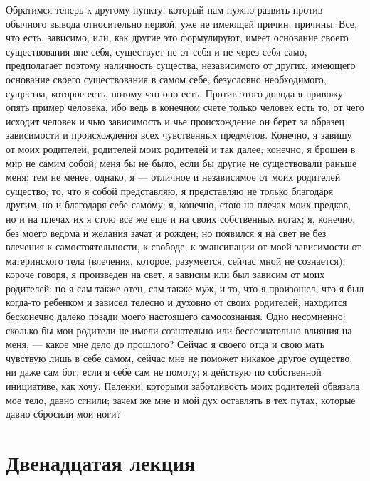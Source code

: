 \documentclass[12pt]{article}
\begin{document}
Обратимся теперь к другому пункту, который нам нужно развить против обычного вывода относительно первой, уже не имеющей причин, причины. Все, что есть, зависимо, или, как другие это формулируют, имеет основание своего существования вне себя, существует не от себя и не через себя само, предполагает поэтому наличность существа, независимого от других, имеющего основание своего существования в самом себе, безусловно необходимого, существа, которое есть, потому что оно есть. Против этого довода я привожу опять пример человека, ибо ведь в конечном счете только человек есть то, от чего исходит человек и чью зависимость и чье происхождение он берет за образец зависимости и происхождения всех чувственных предметов. Конечно, я завишу от моих родителей, родителей моих родителей и так далее; конечно, я брошен в мир не самим собой; меня бы не было, если бы другие не существовали раньше меня; тем не менее, однако, я --- отличное и независимое от моих родителей существо; то, что я собой представляю, я представляю не только благодаря другим, но и благодаря себе самому; я, конечно, стою на плечах моих предков, но и на плечах их я стою все же еще и на своих собственных ногах; я, конечно, без моего ведома и желания зачат и рожден; но появился я на свет не без влечения к самостоятельности, к свободе, к эмансипации от моей зависимости от материнского тела (влечения, которое, разумеется, сейчас мной не сознается); короче говоря, я произведен на свет, я зависим или был зависим от моих родителей; но я сам также отец, сам также муж, и то, что я произошел, что я был когда-то ребенком и зависел телесно и духовно от своих родителей, находится бесконечно далеко позади моего настоящего самосознания. Одно несомненно: сколько бы мои родители не имели сознательно или бессознательно влияния на меня, --- какое мне дело до прошлого? Сейчас я своего отца и свою мать чувствую лишь в себе самом, сейчас мне не поможет никакое другое существо, ни даже сам бог, если я себе сам не помогу; я действую по собственной инициативе, как хочу. Пеленки, которыми заботливость моих родителей обвязала мое тело, давно сгнили; зачем же мне и мой дух оставлять в тех путах, которые давно сбросили мои ноги? 

{}
\section*{Двенадцатая лекция}
\end{document}
